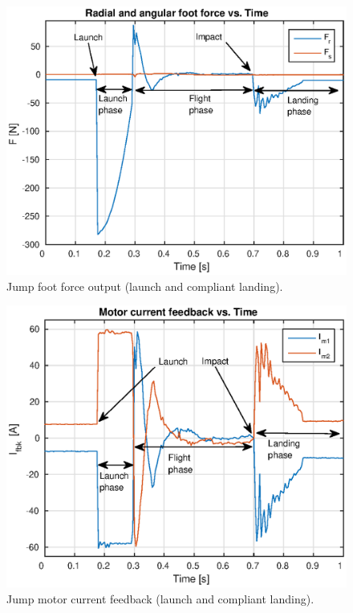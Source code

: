 \begin{figure}
\centering
\includegraphics[width=1\textwidth]{images/experiments/jump/jump-foot-force.eps} 
\caption{Jump foot force output (launch and compliant landing).}
\label{fig:Jump foot force output}
\end{figure}

\begin{figure}
\centering
\includegraphics[width=1\textwidth]{images/experiments/jump/jump-current-feedback.eps} 
\caption{Jump motor current feedback (launch and compliant landing).}
\label{fig:jump-motor-current-feedback}
\end{figure}


